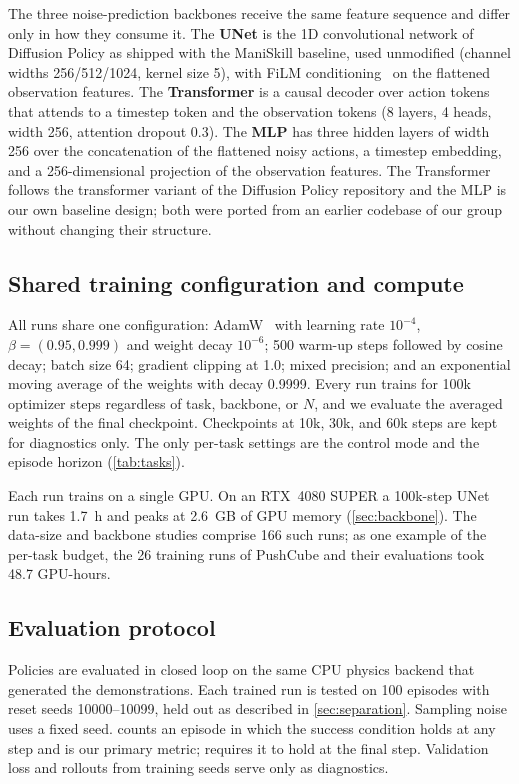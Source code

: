 The three noise-prediction backbones receive the same feature sequence and
differ only in how they consume it. The \textbf{UNet} is the 1D convolutional
network of Diffusion Policy as shipped with the ManiSkill baseline, used
unmodified (channel widths 256/512/1024, kernel size 5), with
FiLM conditioning~\citep{perez2018film} on the flattened observation
features. The \textbf{Transformer} is a causal
decoder over action tokens that attends to a timestep token and the observation
tokens (8 layers, 4 heads, width 256, attention dropout 0.3). The \textbf{MLP}
has three hidden layers of width 256 over the concatenation of the flattened
noisy actions, a timestep embedding, and a 256-dimensional projection of the
observation features.
The Transformer follows the transformer variant of the Diffusion Policy
repository and the MLP is our own baseline design; both were ported from an
earlier codebase of our group without changing their structure.

\subsection{Shared training configuration and compute}
All runs share one configuration: AdamW~\citep{loshchilov2019adamw} with
learning rate $10^{-4}$,
$\beta=(0.95,0.999)$ and weight decay $10^{-6}$; 500 warm-up steps followed by
cosine decay; batch size 64; gradient clipping at 1.0; mixed precision; and an
exponential moving average of the weights with decay 0.9999. Every run trains
for 100k optimizer steps regardless of task, backbone, or $N$, and we evaluate
the averaged weights of the final checkpoint. Checkpoints at 10k, 30k, and 60k
steps are kept for diagnostics only. The only per-task settings are the control
mode and the episode horizon (\cref{tab:tasks}).

Each run trains on a single GPU. On an RTX~4080 SUPER a 100k-step UNet run
takes 1.7~h and peaks at 2.6~GB of GPU memory (\cref{sec:backbone}). The
data-size and backbone studies comprise 166 such runs; as one example of the
per-task budget, the 26 training runs of PushCube and their evaluations took
48.7 GPU-hours.

\subsection{Evaluation protocol}
Policies are evaluated in closed loop on the same CPU physics backend that
generated the demonstrations. Each trained run is tested on 100 episodes with
reset seeds 10000--10099, held out as described in \cref{sec:separation}.
Sampling noise uses a fixed seed.
\metriconce{} counts an episode in which the success condition holds at any
step and is our primary metric; \metricend{} requires it to hold at the final
step. Validation loss and rollouts from training seeds serve only as
diagnostics.

